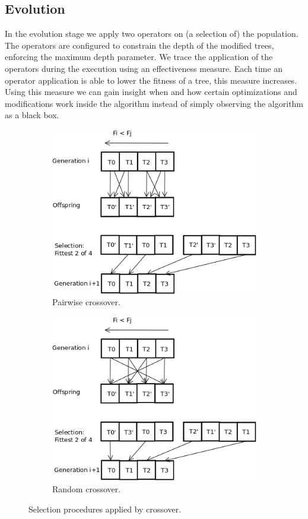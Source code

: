 \subsection{Evolution}
In the evolution stage we apply two operators on (a selection of) the population. The operators are configured to constrain the depth of the modified trees, enforcing the maximum depth parameter.
We trace the application of the operators during the execution using an effectiveness measure. Each time an operator application is able to lower the fitness of a tree, this measure increases. Using this measure we can gain insight when and how certain optimizations and modifications work inside the algorithm instead of simply observing the algorithm as a black box.
 \begin{figure}
    \centering
    \begin{subfigure}{0.5\textwidth}
    \centering
        \includegraphics[width=0.8\linewidth]{figures/pairwisecrossover.png}
        \caption{Pairwise crossover.}
    \end{subfigure}
    \begin{subfigure}{0.5\textwidth}
    \centering
        \includegraphics[width=0.8\linewidth]{figures/randomcrossover.png}
        \caption{Random crossover.}
    \end{subfigure}
    \caption{Selection procedures applied by crossover.}
    \label{fig:crossoverselection}
\end{figure}

